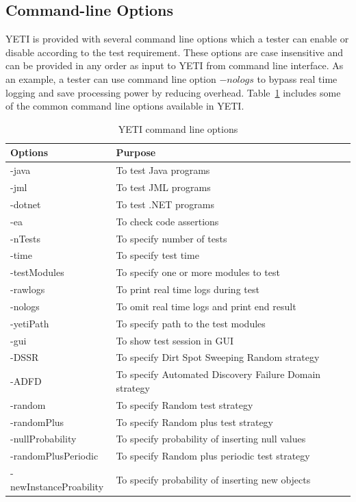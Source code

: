\subsection{Command-line Options}
YETI is provided with several command line options which a tester can enable or disable according to the test requirement. These options are case insensitive and can be provided in any order as input to YETI from command line interface. As an example, a tester can use command line option $-nologs$ to bypass real time logging and save processing power by reducing overhead. Table~\ref{table:cliOptions} includes some of the common command line options available in YETI.

\begin{table}[h]
\caption{YETI command line options} %
\bigskip
\centering
{\renewcommand{\arraystretch}{1.5}
\begin{tabular}{|l|l|} %
\hline

Options						&Purpose 										\\ \hline
-java						&To test Java programs	 						\\ \hline
-jml							&To test JML programs							\\ \hline
-dotnet						&To test .NET programs							\\ \hline
-ea							&To check code assertions 						\\ \hline
-nTests						&To specify number of tests						\\ \hline
-time						&To specify test time								\\ \hline
-testModules				&To specify one or more modules to test 			\\ \hline
-rawlogs					&To print real time logs during test 				\\ \hline
-nologs						&To omit real time logs and print end result		\\ \hline
-yetiPath					&To specify path to the test modules				\\ \hline
-gui							&To show test session in GUI						\\ \hline
-DSSR						&To specify Dirt Spot Sweeping Random strategy 	\\ \hline
-ADFD						&To specify Automated Discovery Failure Domain strategy \\ \hline
-random					&To specify Random test strategy					\\ \hline
-randomPlus					&To specify Random plus test strategy				\\ \hline
-nullProbability				&To specify probability of inserting null values		\\ \hline
-randomPlusPeriodic			&To specify Random plus periodic test strategy		\\ \hline
-newInstanceProability		&To specify probability of inserting new objects		\\ \hline

\hline %
\end{tabular}
}
\bigskip
\label{table:cliOptions} %
\end{table}


